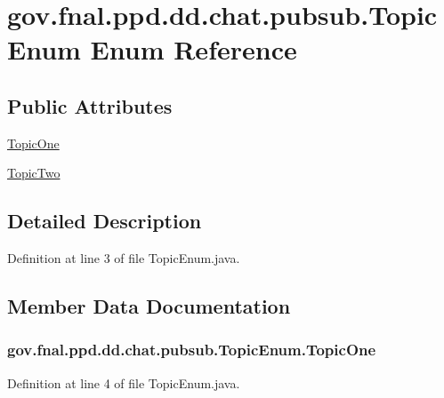 \hypertarget{enumgov_1_1fnal_1_1ppd_1_1dd_1_1chat_1_1pubsub_1_1TopicEnum}{\section{gov.\-fnal.\-ppd.\-dd.\-chat.\-pubsub.\-Topic\-Enum Enum Reference}
\label{enumgov_1_1fnal_1_1ppd_1_1dd_1_1chat_1_1pubsub_1_1TopicEnum}
}
\subsection*{Public Attributes}
\begin{DoxyCompactItemize}
\item 
\hyperlink{enumgov_1_1fnal_1_1ppd_1_1dd_1_1chat_1_1pubsub_1_1TopicEnum_ad4325085473b7c773ffa0a4accc350a3}{Topic\-One}
\item 
\hyperlink{enumgov_1_1fnal_1_1ppd_1_1dd_1_1chat_1_1pubsub_1_1TopicEnum_ad9de979f98663978fba2a422ea93e9d6}{Topic\-Two}
\end{DoxyCompactItemize}


\subsection{Detailed Description}


Definition at line 3 of file Topic\-Enum.\-java.



\subsection{Member Data Documentation}
\hypertarget{enumgov_1_1fnal_1_1ppd_1_1dd_1_1chat_1_1pubsub_1_1TopicEnum_ad4325085473b7c773ffa0a4accc350a3}{
\subsubsection[{Topic\-One}]{\setlength{\rightskip}{0pt plus 5cm}gov.\-fnal.\-ppd.\-dd.\-chat.\-pubsub.\-Topic\-Enum.\-Topic\-One}}\label{enumgov_1_1fnal_1_1ppd_1_1dd_1_1chat_1_1pubsub_1_1TopicEnum_ad4325085473b7c773ffa0a4accc350a3}


Definition at line 4 of file Topic\-Enum.\-java.


